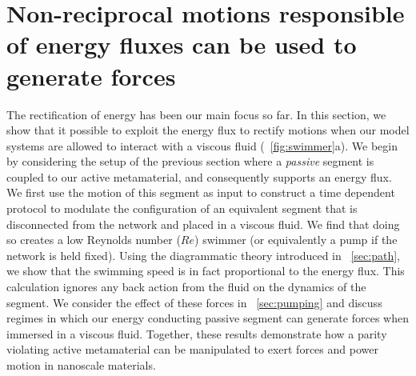 \documentclass[
 preprint,
 preprintnumbers,
 amsmath,amssymb,
 aps,
 pre,
 longbibliography,
 superscriptaddress,
 10pt, twocolumn
]{revtex4-1}
\begin{document}
\section{Non-reciprocal motions responsible of energy fluxes can be used to generate forces} \label{sec:swimmer}




The rectification of energy has been our main focus so far. In this section, we show that it possible to exploit the energy flux to rectify motions when our model systems are allowed to interact with a viscous fluid (\figurename~\ref{fig:swimmer}a).
We begin by considering the setup of the previous section where a {\it passive} segment is coupled to our active metamaterial, and consequently supports an energy flux.
We first use the motion of this segment as input to construct a time dependent protocol to modulate the configuration of an equivalent segment that is disconnected from the network and placed in a viscous fluid. We find that doing so creates a low Reynolds number ($Re$) swimmer (or equivalently a pump if the network is held fixed). Using the diagrammatic theory introduced in \secname~\ref{sec:path}, we show that the swimming speed is in fact proportional to the energy flux. This calculation ignores any back action from the fluid on the dynamics of the segment. We consider the effect of these forces in \secname~\ref{sec:pumping} and discuss regimes in which our energy conducting passive segment can generate forces when immersed in a viscous fluid. Together, these results demonstrate how a parity violating active metamaterial can be manipulated to exert forces and power motion in nanoscale materials.  
\end{document}

